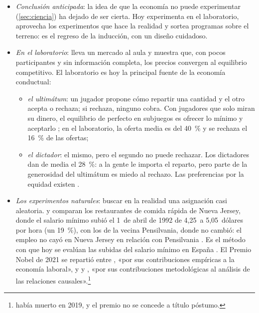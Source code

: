 \documentclass[11pt]{article}
\begin{document}
\begin{itemize}
\item \emph{Conclusión anticipada}: la idea de que la economía no puede experimentar (\ref{sec:ciencia}) ha dejado de ser cierta. Hoy experimenta en el laboratorio, aprovecha los experimentos que hace la realidad y sortea programas sobre el terreno: es el regreso de la inducción, con un diseño cuidadoso.
\item \emph{En el laboratorio}:  \parencite*{Smith1962Experimental} lleva un mercado al aula y muestra que, con pocos participantes y sin información completa, los precios convergen al equilibrio competitivo\nocite{Nobel2002Smith}. El laboratorio es hoy la principal fuente de la economía conductual:
  \begin{itemize}
  \item \emph{el ultimátum}\nocite{GuthSchmittbergerSchwarze1982Ultimatum}: un jugador propone cómo repartir una cantidad y el otro acepta o rechaza; si rechaza, ninguno cobra. Con jugadores que solo miran su dinero, el equilibrio de  perfecto en subjuegos es ofrecer lo mínimo y aceptarlo ; en el laboratorio, la oferta media es del 40~\% y se rechaza el 16~\% de las ofertas\nocite{OosterbeekSloofVandeKuilen2004Cultural};
  \item \emph{el dictador}\nocite{Forsythe1994Fairness}: el mismo, pero el segundo no puede rechazar. Los dictadores dan de media el 28~\%\nocite{Engel2011Dictator}: a la gente le importa el reparto, pero parte de la generosidad del ultimátum es miedo al rechazo. Las preferencias por la equidad existen .
  \end{itemize}
\item \emph{Los experimentos naturales}: buscar en la realidad una asignación casi aleatoria.  y  comparan los restaurantes de comida rápida de Nueva Jersey, donde el salario mínimo subió el 1~de abril de 1992 de 4,25~a 5,05~dólares por hora (un 19~\%), con los de la vecina Pensilvania, donde no cambió: el empleo no cayó en Nueva Jersey en relación con Pensilvania\nocite{CardKrueger1994} . Es el método con que hoy se evalúan las subidas del salario mínimo en España . El Premio Nobel de 2021 se repartió entre , «por sus contribuciones empíricas a la economía laboral», y  y , «por sus contribuciones metodológicas al análisis de las relaciones causales»\nocite{Nobel2021CardAngristImbens}.\footnote{ había muerto en 2019\nocite{Princeton2019Krueger}, y el premio no se concede a título póstumo.}

\end{itemize}
\end{document}
